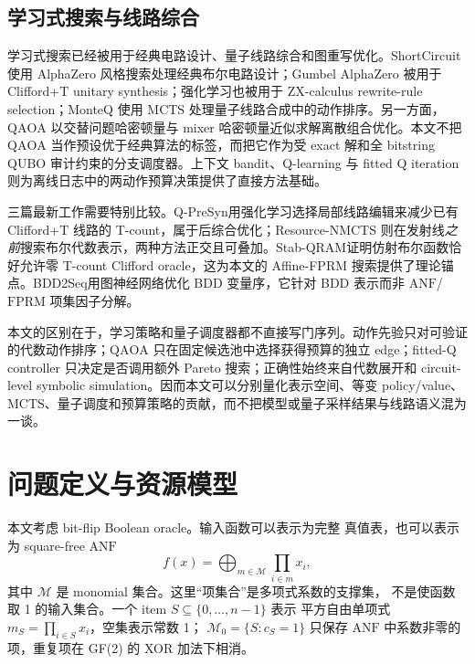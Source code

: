 \documentclass[UTF8,fontset=fandol,11pt]{ctexart}
\newcommand{\method}{Resource-NMCTS}
\newcommand{\anf}{\ensuremath{\mathrm{ANF}}}
\newcommand{\fprm}{\ensuremath{\mathrm{FPRM}}}
\newcommand{\mcts}{\ensuremath{\mathrm{MCTS}}}
\newcommand{\qaoa}{\ensuremath{\mathrm{QAOA}}}
\newcommand{\ttable}{真值表}
\begin{document}
\subsection{学习式搜索与线路综合}

学习式搜索已经被用于经典电路设计、量子线路综合和图重写优化。ShortCircuit 使用 AlphaZero 风格搜索处理经典布尔电路设计\cite{tsaras2024shortcircuit}；Gumbel AlphaZero 被用于 Clifford+T unitary synthesis\cite{rietsch2024unitary}；强化学习也被用于 ZX-calculus rewrite-rule selection\cite{riu2025rlzx}；MonteQ 使用 \mcts{} 处理量子线路合成中的动作排序\cite{machiya2026monteq}。另一方面，\qaoa{} 以交替问题哈密顿量与 mixer 哈密顿量近似求解离散组合优化\cite{farhi2014qaoa}。本文不把 \qaoa{} 当作预设优于经典算法的标签，而把它作为受 exact 解和全 bitstring QUBO 审计约束的分支调度器。上下文 bandit、Q-learning 与 fitted Q iteration 则为离线日志中的两动作预算决策提供了直接方法基础\cite{li2010contextual,watkins1992qlearning,ernst2005fittedq}。

三篇最新工作需要特别比较。Q-PreSyn\cite{qpresyn2026}用强化学习选择局部线路编辑来减少已有 Clifford+T 线路的 T-count，属于后综合优化；\method{} 则在发射线\emph{之前}搜索布尔代数表示，两种方法正交且可叠加。Stab-QRAM\cite{stabqram2025}证明仿射布尔函数恰好允许零 T-count Clifford oracle，这为本文的 Affine-FPRM 搜索提供了理论锚点。BDD2Seq\cite{bdd2seq2025}用图神经网络优化 BDD 变量序，它针对 BDD 表示而非 \anf{}/\fprm{} 项集因子分解。

本文的区别在于，学习策略和量子调度器都不直接写门序列。动作先验只对可验证的代数动作排序；\qaoa{} 只在固定候选池中选择获得预算的独立 edge；fitted-Q controller 只决定是否调用额外 Pareto 搜索；正确性始终来自代数展开和 circuit-level symbolic simulation。因而本文可以分别量化表示空间、等变 policy/value、\mcts{}、量子调度和预算策略的贡献，而不把模型或量子采样结果与线路语义混为一谈。

\section{问题定义与资源模型}

本文考虑 bit-flip Boolean oracle。输入函数可以表示为完整 \ttable{}，也可以表示为 square-free \anf{}
\begin{equation}
  f(x)=\bigoplus_{m\in\mathcal{M}}\prod_{i\in m}x_i ,
  \label{eq:anf}
\end{equation}
其中 $\mathcal{M}$ 是 monomial 集合。这里“项集合”是多项式系数的支撑集，
不是使函数取 1 的输入集合。一个 item $S\subseteq\{0,\ldots,n-1\}$ 表示
平方自由单项式 $m_S=\prod_{i\in S}x_i$，空集表示常数 1；
$\mathcal{M}_0=\{S:c_S=1\}$ 只保存 \anf{} 中系数非零的项，重复项在 GF(2)
的 XOR 加法下相消。
\end{document}
